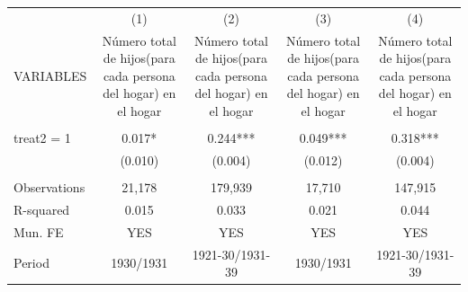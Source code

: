 \begin{tabular}{lcccc} \hline
 & (1) & (2) & (3) & (4) \\
VARIABLES & Número total de hijos(para cada persona del hogar) en el hogar & Número total de hijos(para cada persona del hogar) en el hogar & Número total de hijos(para cada persona del hogar) en el hogar & Número total de hijos(para cada persona del hogar) en el hogar \\ \hline
 &  &  &  &  \\
treat2 = 1 & 0.017* & 0.244*** & 0.049*** & 0.318*** \\
 & (0.010) & (0.004) & (0.012) & (0.004) \\
 &  &  &  &  \\
Observations & 21,178 & 179,939 & 17,710 & 147,915 \\
R-squared & 0.015 & 0.033 & 0.021 & 0.044 \\
Mun. FE & YES & YES & YES & YES \\
 Period & 1930/1931 & 1921-30/1931-39 & 1930/1931 & 1921-30/1931-39 \\ \hline
\end{tabular}
